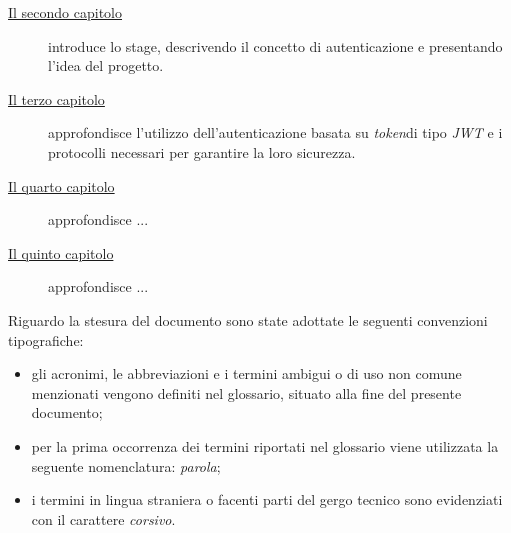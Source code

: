 \begin{description}
    \item[{\hyperref[cap:inquadramento-stage]{Il secondo capitolo}}] introduce lo stage, descrivendo il concetto di autenticazione e presentando l'idea del progetto.
    
    \item[{\hyperref[cap:autenticazione-jwt]{Il terzo capitolo}}] approfondisce l'utilizzo dell'autenticazione basata su \emph{\gls{token}}\glsfirstoccur di tipo \emph{JWT} e i protocolli necessari per garantire la loro sicurezza.
    
    \item[{\hyperref[cap:analisi-requisiti]{Il quarto capitolo}}] approfondisce ...
    
    \item[{\hyperref[cap:progettazione-codifica]{Il quinto capitolo}}] approfondisce ...
\end{description}

Riguardo la stesura del documento sono state adottate le seguenti convenzioni tipografiche:
\begin{itemize}
	\item gli acronimi, le abbreviazioni e i termini ambigui o di uso non comune menzionati vengono definiti nel glossario, situato alla fine del presente documento;
	\item per la prima occorrenza dei termini riportati nel glossario viene utilizzata la seguente nomenclatura: \emph{parola}\glsfirstoccur;
	\item i termini in lingua straniera o facenti parti del gergo tecnico sono evidenziati con il carattere \emph{corsivo}.
\end{itemize}
